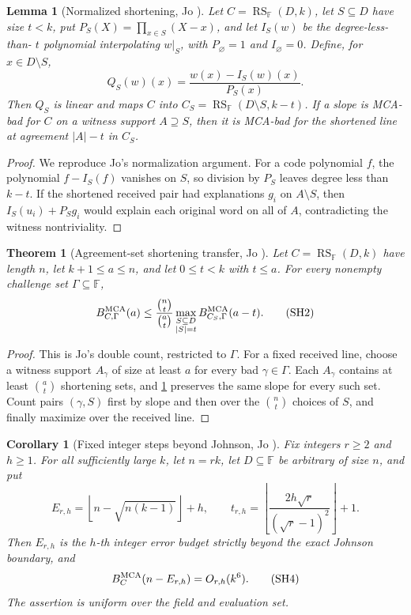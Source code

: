\documentclass[11pt,a4paper]{amsart}
\numberwithin{equation}{section}
\newtheorem{theorem}{Theorem}[section]
\newtheorem{lemma}[lemma]{Lemma}
\newtheorem{corollary}[corollary]{Corollary}
\theoremstyle{remark}
\DeclareMathOperator{\RS}{RS}
\newcommand{\F}{\mathbb F}
\newcommand{\abs}[1]{\lvert #1\rvert}
\newcommand{\floor}[1]{\left\lfloor #1\right\rfloor}
\begin{document}
\begin{lemma}[Normalized shortening, Jo
  {\cite[Lem.~3.1]{Jo26}}]\label{lem:jo-shortening-map}
Let \(C=\RS_\F(D,k)\), let \(S\subseteq D\) have size \(t<k\), put
\(P_S(X)=\prod_{x\in S}(X-x)\), and let \(I_S(w)\) be the degree-less-than-
\(t\) polynomial interpolating \(w|_S\), with
\(P_\varnothing=1\) and \(I_\varnothing=0\).  Define, for
\(x\in D\setminus S\),
\[
 Q_S(w)(x)=\frac{w(x)-I_S(w)(x)}{P_S(x)}.          \tag{SH1}
\]
Then \(Q_S\) is linear and maps \(C\) into
\(C_S=\RS_\F(D\setminus S,k-t)\).  If a slope is MCA-bad for \(C\) on a
witness support \(A\supseteq S\), then it is MCA-bad for the shortened line
at agreement \(\abs A-t\) in \(C_S\).
\end{lemma}

\begin{proof}
We reproduce Jo's normalization argument.  For a code polynomial \(f\),
the polynomial \(f-I_S(f)\) vanishes on
\(S\), so division by \(P_S\) leaves degree less than \(k-t\).  If the
shortened received pair had explanations \(g_i\) on \(A\setminus S\), then
\(I_S(u_i)+P_Sg_i\) would explain each original word on all of \(A\),
contradicting the witness nontriviality.
\end{proof}

\begin{theorem}[Agreement-set shortening transfer, Jo
  {\cite[Thm.~3.2]{Jo26}}]\label{thm:jo-shortening-transfer}
Let \(C=\RS_\F(D,k)\) have length \(n\), let \(k+1\le a\le n\), and let
\(0\le t<k\) with \(t\le a\).  For every nonempty challenge set
\(\Gamma\subseteq\F\),
\[
 B_{C,\Gamma}^{\rm MCA}(a)
 \le \frac{\binom nt}{\binom at}
       \max_{\substack{S\subseteq D\\\abs S=t}}
       B_{C_S,\Gamma}^{\rm MCA}(a-t).              \tag{SH2}
 \label{eq:jo-shortening-transfer}
\]
\end{theorem}

\begin{proof}
This is Jo's double count, restricted to \(\Gamma\).  For a fixed received
line, choose a witness support \(A_\gamma\) of size at
least \(a\) for every bad \(\gamma\in\Gamma\).  Each \(A_\gamma\) contains
at least \(\binom at\) shortening sets, and
\cref{lem:jo-shortening-map} preserves the same slope for every such set.
Count pairs \((\gamma,S)\) first by slope and then over the \(\binom nt\)
choices of \(S\), and finally maximize over the received line.
\end{proof}

\begin{corollary}[Fixed integer steps beyond Johnson, Jo
  {\cite[Thm.~3.4]{Jo26}}]\label{cor:jo-fixed-johnson-steps}
Fix integers \(r\ge2\) and \(h\ge1\).  For all sufficiently large \(k\),
let \(n=rk\), let \(D\subseteq\F\) be arbitrary of size \(n\), and put
\[
 E_{r,h}=\floor{n-\sqrt{n(k-1)}}+h,\qquad
 t_{r,h}=\floor{\frac{2h\sqrt r}{(\sqrt r-1)^2}}+1. \tag{SH3}
\]
Then \(E_{r,h}\) is the \(h\)-th integer error budget strictly beyond the
exact Johnson boundary, and
\[
 B_C^{\rm MCA}(n-E_{r,h})=O_{r,h}(k^6).            \tag{SH4}
\]
The assertion is uniform over the field and evaluation set.
\end{corollary}
\end{document}
